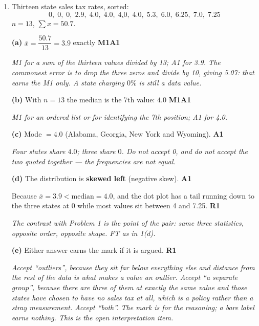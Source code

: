 \documentclass[12pt, twoside]{article}
\begin{document}
\begin{enumerate}[itemsep=0.3cm]
\textbf{(e)} \textbf{Hungary} at $27\%$: it sits well above the rest, with a
gap between it and the next value ($25\%$), far from where the bulk of the data
lies. \hfill \textbf{R1}

\emph{R1 requires the country (or the value 27) \emph{and} a reason of the
right kind --- distance from the rest of the data, or the gap. ``It is the
biggest'' earns nothing: every data set has a biggest value. No $1.5 \times$ IQR
test is expected here; the definition in use is informal.}

\newpage

\item[2.] [Maximum mark: 8]

Thirteen state sales tax rates, sorted:
$$0,\; 0,\; 0,\; 2.9,\; 4.0,\; 4.0,\; \underline{4.0},\; 4.0,\; 5.3,\; 6.0,\; 6.25,\; 7.0,\; 7.25$$
$n = 13$, $\sum x = 50.7$.

\textbf{(a)} $\bar{x} = \dfrac{50.7}{13} = 3.9$ exactly \hfill \textbf{M1A1}

\emph{M1 for a sum of the thirteen values divided by 13; A1 for 3.9. The
commonest error is to drop the three zeros and divide by 10, giving 5.07: that
earns the M1 only. A state charging $0\%$ is still a data value.}

\textbf{(b)} With $n = 13$ the median is the 7th value: $4.0$
\hfill \textbf{M1A1}

\emph{M1 for an ordered list or for identifying the 7th position; A1 for 4.0.}

\textbf{(c)} Mode $= 4.0$ (Alabama, Georgia, New York and Wyoming).
\hfill \textbf{A1}

\emph{Four states share $4.0$; three share $0$. Do not accept 0, and do not
accept the two quoted together --- the frequencies are not equal.}

\textbf{(d)} The distribution is \textbf{skewed left} (negative skew).
\hfill \textbf{A1}

Because $\bar{x} = 3.9 < \text{median} = 4.0$, and the dot plot has a tail
running down to the three states at $0$ while most values sit between 4 and
7.25. \hfill \textbf{R1}

\emph{The contrast with Problem 1 is the point of the pair: same three
statistics, opposite order, opposite shape. FT as in 1(d).}

\textbf{(e)} Either answer earns the mark if it is argued.
\hfill \textbf{R1}

\emph{Accept ``outliers'', because they sit far below everything else and
distance from the rest of the data is what makes a value an outlier. Accept
``a separate group'', because there are three of them at exactly the same
value and those states have chosen to have no sales tax at all, which is a
policy rather than a stray measurement. Accept ``both''. The mark is for the
reasoning; a bare label earns nothing. This is the open interpretation item.}


\end{enumerate}
\end{document}
